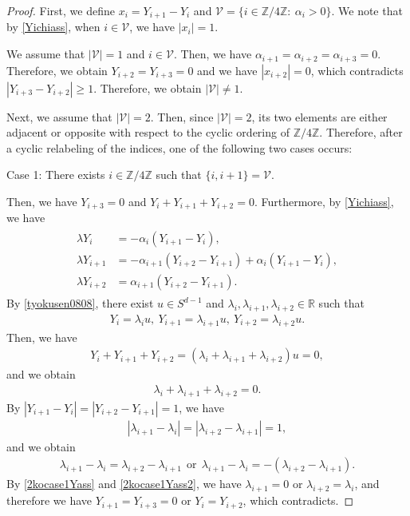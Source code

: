\documentclass[reqno]{amsart}
\theoremstyle{plain}
\theoremstyle{definition}
\numberwithin{equation}{section}
\begin{document}
\begin{proof}
First, we define $x_i=Y_{i+1}-Y_i$ and $\mathcal{V}=\{ i\in\mathbb{Z}/4\mathbb{Z}:\ \alpha_i>0\}$. We note that by \eqref{Yichiass}, when $i\in\mathcal{V}$, we have $|x_i|=1$. 

We assume that $|\mathcal{V}|=1$ and $i\in\mathcal{V}$. Then, we have $\alpha_{i+1}=\alpha_{i+2}=\alpha_{i+3}=0$. Therefore, we obtain $Y_{i+2}=Y_{i+3}=0$ and we have $|x_{i+2}|=0$, which contradicts $|Y_{i+3}-Y_{i+2}|\geq 1$. Therefore, we obtain $|\mathcal{V}|\neq 1$.

Next, we assume that $|\mathcal{V}|=2$. Then, since $|\mathcal{V}|=2$, its two elements are either adjacent or opposite with respect to the cyclic ordering of $\mathbb{Z}/4\mathbb{Z}$. Therefore, after a cyclic relabeling of the indices, one of the following two cases occurs:


Case 1: There exists $i\in\mathbb{Z}/4\mathbb{Z}$ such that $\{i,i+1\}=\mathcal{V}$.


Then, we have $Y_{i+3}=0$ and $Y_i+Y_{i+1}+Y_{i+2}=0$. Furthermore, by \eqref{Yichiass}, we have
\begin{align}\label{tyokusen0808}
\begin{aligned}
\lambda Y_i&=-\alpha_i\left(Y_{i+1}-Y_i\right),
\\
\lambda Y_{i+1}&=-\alpha_{i+1}\left(Y_{i+2}-Y_{i+1}\right)+\alpha_i\left(Y_{i+1}-Y_i\right),
\\
\lambda Y_{i+2}&=\alpha_{i+1}\left(Y_{i+2}-Y_{i+1}\right).
\end{aligned}
\end{align}
By \eqref{tyokusen0808}, there exist $u\in S^{d-1}$ and $\lambda_i,\lambda_{i+1},\lambda_{i+2}\in \mathbb{R}$ such that 
\begin{align*}
Y_i=\lambda_iu,\ Y_{i+1}=\lambda_{i+1}u,\ Y_{i+2}=\lambda_{i+2}u.
\end{align*}
Then, we have
\begin{align*}
Y_i+Y_{i+1}+Y_{i+2}=\left(\lambda_i+\lambda_{i+1}+\lambda_{i+2}\right)u=0,
\end{align*}
and we obtain 
\begin{align}\label{2kocase1Yass}
\lambda_i+\lambda_{i+1}+\lambda_{i+2}=0.
\end{align}
By $|Y_{i+1}-Y_i|=|Y_{i+2}-Y_{i+1}|=1$, we have 
\begin{align*}
\left|\lambda_{i+1}-\lambda_i\right|=\left|\lambda_{i+2}-\lambda_{i+1}\right|=1,
\end{align*}
and we obtain
\begin{align}\label{2kocase1Yass2}
\lambda_{i+1}-\lambda_i=\lambda_{i+2}-\lambda_{i+1}\ \ \mbox{or}\ \ \lambda_{i+1}-\lambda_i=-\left(\lambda_{i+2}-\lambda_{i+1}\right). 
\end{align}
By \eqref{2kocase1Yass} and \eqref{2kocase1Yass2}, we have $\lambda_{i+1}=0$ or $\lambda_{i+2}=\lambda_i$, and therefore we have $Y_{i+1}=Y_{i+3}=0$ or  $Y_i=Y_{i+2}$, which contradicts.



\end{proof}
\end{document}
